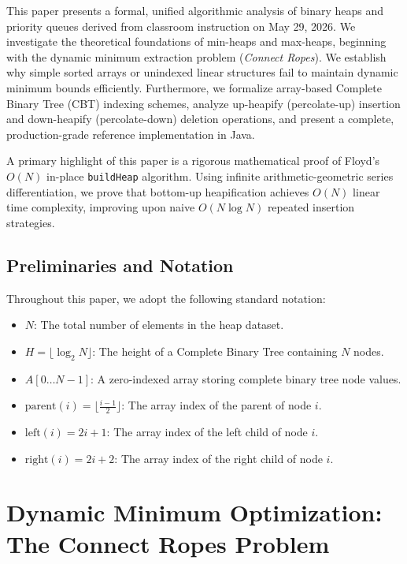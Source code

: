 \documentclass[10pt,journal,compsoc,onecolumn]{IEEEtran}
\begin{document}
This paper presents a formal, unified algorithmic analysis of binary heaps and priority queues derived from classroom instruction on May 29, 2026. We investigate the theoretical foundations of min-heaps and max-heaps, beginning with the dynamic minimum extraction problem (\emph{Connect Ropes}). We establish why simple sorted arrays or unindexed linear structures fail to maintain dynamic minimum bounds efficiently. Furthermore, we formalize array-based Complete Binary Tree (CBT) indexing schemes, analyze up-heapify (percolate-up) insertion and down-heapify (percolate-down) deletion operations, and present a complete, production-grade reference implementation in Java.

A primary highlight of this paper is a rigorous mathematical proof of Floyd's $O(N)$ in-place \texttt{buildHeap} algorithm. Using infinite arithmetic-geometric series differentiation, we prove that bottom-up heapification achieves $O(N)$ linear time complexity, improving upon naive $O(N \log N)$ repeated insertion strategies.

\subsection{Preliminaries and Notation}

Throughout this paper, we adopt the following standard notation:
\begin{itemize}
    \item $N$: The total number of elements in the heap dataset.
    \item $H = \lfloor \log_2 N \rfloor$: The height of a Complete Binary Tree containing $N$ nodes.
    \item $A[0 \dots N-1]$: A zero-indexed array storing complete binary tree node values.
    \item $\text{parent}(i) = \lfloor \frac{i-1}{2} \rfloor$: The array index of the parent of node $i$.
    \item $\text{left}(i) = 2i + 1$: The array index of the left child of node $i$.
    \item $\text{right}(i) = 2i + 2$: The array index of the right child of node $i$.
\end{itemize}

\section{Dynamic Minimum Optimization: The Connect Ropes Problem}
\label{sec:connect-ropes}
\end{document}
